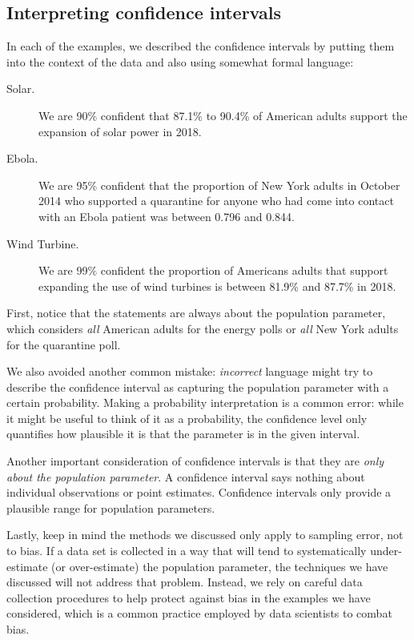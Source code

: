 \subsection{Interpreting confidence intervals}
\label{interpretingCIs}


In each of the examples, we described the confidence
intervals by putting them into the context of the data and also
using somewhat formal language:
\begin{description}
  \item[Solar.] We are 90\% confident that 87.1\% to 90.4\% of
      American adults support the expansion of solar power in 2018.
  \item[Ebola.] We are 95\% confident that the proportion
      of New York adults in October 2014 who supported a quarantine
      for anyone who had come into contact with an Ebola patient was
      between 0.796 and 0.844.
  \item[Wind Turbine.] We are 99\% confident the proportion of
      Americans adults that support expanding the use of wind
      turbines is between 81.9\% and 87.7\% in 2018.
\end{description}
First, notice that the statements are always about the population
parameter, which considers \emph{all} American adults for the
energy polls or \emph{all} New York adults for the quarantine poll.

We also avoided another common mistake:
\emph{incorrect} language might try to describe the confidence interval
as capturing the population parameter with a certain probability.
Making a probability interpretation is a common error:
while it might be useful to think of it as a probability,
the confidence level only quantifies how plausible
it is that the parameter is in the given interval.

Another important consideration of confidence intervals is that they
are \emph{only about the population parameter}.
A confidence interval says nothing about individual
observations or point estimates.
Confidence intervals only provide a plausible range for
population parameters.

Lastly, keep in mind the methods we discussed only apply
to sampling error, not to bias.
If a data set is collected in a way that will tend to
systematically under-estimate
(or over-estimate) the population parameter, the techniques
we have discussed will not address that problem.
Instead, we rely on careful data collection procedures to
help protect against bias in the examples we have considered,
which is a common practice employed by data scientists
to combat bias.

